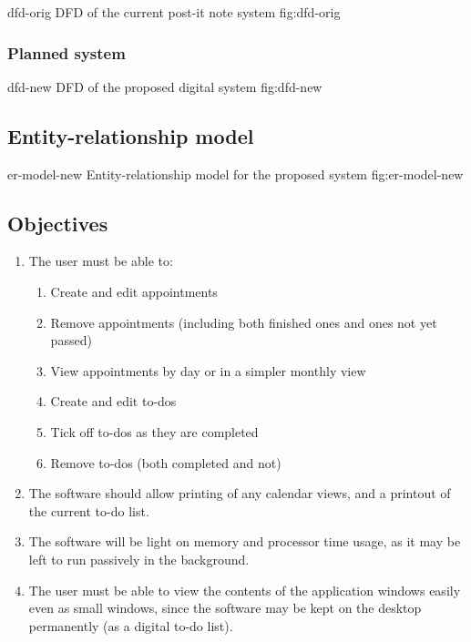 \addfigure
    {dfd-orig}
    {DFD of the current post-it note system}
    {fig:dfd-orig}

\subsubsection{Planned system}

\addfigure
    {dfd-new}
    {DFD of the proposed digital system}
    {fig:dfd-new}


\subsection{Entity-relationship model}

\addfigure
    {er-model-new}
    {Entity-relationship model for the proposed system}
    {fig:er-model-new}


\subsection{Objectives}

\begin{enumerate}
    \item The user must be able to:
    \begin{enumerate}
        \item Create and edit appointments
        \item Remove appointments (including both finished ones and ones not yet
            passed)
        \item View appointments by day or in a simpler monthly view
        \item Create and edit to-dos
        \item Tick off to-dos as they are completed
        \item Remove to-dos (both completed and not)
    \end{enumerate}
    \item The software should allow printing of any calendar views, and a
        printout of the current to-do list.
    \item The software will be light on memory and processor time usage, as it
        may be left to run passively in the background.
    \item The user must be able to view the contents of the application
        windows easily even as small windows, since the software may be kept
        on the desktop permanently (as a digital to-do list).
\end{enumerate}


